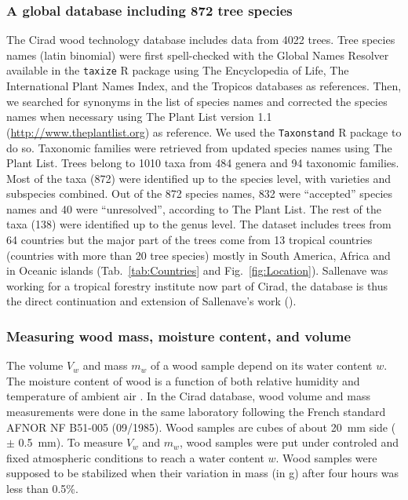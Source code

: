 \documentclass[a4paper, 12pt, leqno, dvipsnames]{article}\usepackage[]{graphicx}\usepackage[]{color}
\begin{document}
\subsubsection{A global database including 872 tree species}

The Cirad wood technology database includes data from 4022 trees. Tree species names (latin binomial) were first spell-checked with the Global Names Resolver available in the \texttt{taxize} R package \citep{Chamberlain2013} using The Encyclopedia of Life, The International Plant Names Index, and the Tropicos databases as references. Then, we searched for synonyms in the list of species names and corrected the species names when necessary using The Plant List version 1.1 (\url{http://www.theplantlist.org}) as reference. We used the \texttt{Taxonstand} R package \citep{Cayuela2017} to do so. Taxonomic families were retrieved from updated species names using The Plant List. Trees belong to 1010 taxa from 484 genera and 94 taxonomic families. Most of the taxa (872) were identified up to the species level, with varieties and subspecies combined. Out of the 872 species names, 832 were ``accepted'' species names and 40 were ``unresolved'', according to The Plant List. The rest of the taxa (138) were identified up to the genus level. The dataset includes trees from 64 countries but the major part of the trees come from 13 tropical countries (countries with more than 20 tree species) mostly in South America, Africa and in Oceanic islands (Tab.~\ref{tab:Countries} and Fig.~\ref{fig:Location}). Sallenave was working for a tropical forestry institute now part of Cirad, the database is thus the direct continuation and extension of Sallenave's work (\citeyear{Sallenave1955, Sallenave1964, Sallenave1971}).

\subsubsection{Measuring wood mass, moisture content, and volume}
\label{seq:mass-volume}

The volume $V_w$ and mass $m_w$ of a wood sample depend on its water content $w$. The moisture content of wood is a function of both relative humidity and temperature of ambient air \citep{Hailwood1946, Glass2010}. In the Cirad database, wood volume and mass measurements were done in the same laboratory following the French standard AFNOR NF B51-005 (09/1985). Wood samples are cubes of about 20~mm side ($\pm$ 0.5~mm). To measure $V_w$ and $m_w$, wood samples were put under controled and fixed atmospheric conditions to reach a water content $w$. Wood samples were supposed to be stabilized when their variation in mass (in g) after four hours was less than 0.5\%.
\end{document}
